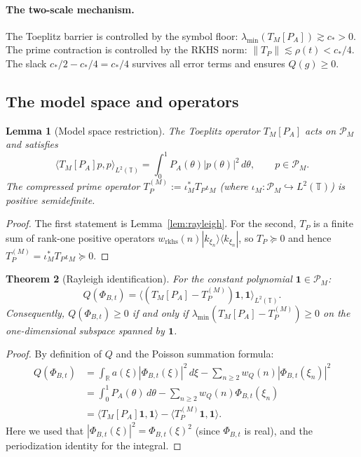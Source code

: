 \documentclass[11pt,a4paper]{article}
\newtheorem{theorem}{Theorem}[section]
\newtheorem{lemma}[theorem]{Lemma}
\theoremstyle{definition}
\theoremstyle{remark}
\newcommand{\R}{\mathbb{R}}
\newcommand{\T}{\mathbb{T}}
\begin{document}
\paragraph{The two-scale mechanism.}
The Toeplitz barrier is controlled by the symbol floor: $\lambda_{\min}(T_M[P_A]) \gtrsim c_* > 0$. The prime contraction is controlled by the RKHS norm: $\|T_P\| \lesssim \rho(t) < c_*/4$. The slack $c_*/2 - c_*/4 = c_*/4$ survives all error terms and ensures $Q(g) \geq 0$.

\subsection{The model space and operators}

\begin{lemma}[Model space restriction]\label{lem:model}
The Toeplitz operator $T_M[P_A]$ acts on $\mathcal{P}_M$ and satisfies
\[
  \langle T_M[P_A] p, p \rangle_{L^2(\T)} = \int_0^1 P_A(\theta) |p(\theta)|^2\, d\theta, \qquad p \in \mathcal{P}_M.
\]
The compressed prime operator $T_P^{(M)} := \iota_M^* T_P \iota_M$ (where $\iota_M : \mathcal{P}_M \hookrightarrow L^2(\T)$) is positive semidefinite.
\end{lemma}

\begin{proof}
The first statement is Lemma~\ref{lem:rayleigh}. For the second, $T_P$ is a finite sum of rank-one positive operators $w_{\mathrm{rkhs}}(n) |k_{\xi_n}\rangle \langle k_{\xi_n}|$, so $T_P \succeq 0$ and hence $T_P^{(M)} = \iota_M^* T_P \iota_M \succeq 0$.
\end{proof}

\begin{theorem}[Rayleigh identification]\label{thm:rayleigh}
For the constant polynomial $\mathbf{1} \in \mathcal{P}_M$:
\begin{equation}\label{eq:rayleigh-id}
  Q(\Phi_{B,t}) = \langle (T_M[P_A] - T_P^{(M)}) \mathbf{1}, \mathbf{1} \rangle_{L^2(\T)}.
\end{equation}
Consequently, $Q(\Phi_{B,t}) \geq 0$ if and only if $\lambda_{\min}(T_M[P_A] - T_P^{(M)}) \geq 0$ on the one-dimensional subspace spanned by $\mathbf{1}$.
\end{theorem}

\begin{proof}
By definition of $Q$ and the Poisson summation formula:
\begin{align*}
  Q(\Phi_{B,t}) &= \int_{\R} a(\xi) |\Phi_{B,t}(\xi)|^2\, d\xi - \sum_{n \geq 2} w_Q(n) |\Phi_{B,t}(\xi_n)|^2 \\
  &= \int_0^1 P_A(\theta)\, d\theta - \sum_{n \geq 2} w_Q(n) \Phi_{B,t}(\xi_n) \\
  &= \langle T_M[P_A] \mathbf{1}, \mathbf{1} \rangle - \langle T_P^{(M)} \mathbf{1}, \mathbf{1} \rangle.
\end{align*}
Here we used that $|\Phi_{B,t}(\xi)|^2 = \Phi_{B,t}(\xi)^2$ (since $\Phi_{B,t}$ is real), and the periodization identity for the integral.
\end{proof}
\end{document}
